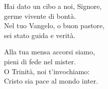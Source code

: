 
\strofa Hai dato un cibo a noi, Signore,\\
germe vivente di bontà.\\
Nel tuo Vangelo, o buon pastore,\\
sei stato guida e verità.

\spazio


\spazio

\strofa Alla tua mensa accorsi siamo,\\
pieni di fede nel mister.\\
O Trinità, noi t'invochiamo:\\
Cristo sia pace al mondo inter.

\spazio

